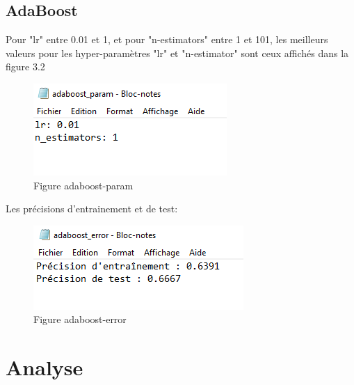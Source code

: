 \subsection{AdaBoost} 
\par Pour "lr" entre 0.01 et 1, et pour "n-estimators" entre 1 et 101, les meilleurs valeurs pour les hyper-paramètres "lr" et "n-estimator" sont ceux affichés dans la figure 3.2
\begin{figure}[H]
    \centering
    \includegraphics{adaboost_param.PNG}
    \caption{Figure adaboost-param }
    \label{Figure fichier adaboost-param }
\end{figure}
\par Les précisions d'entrainement et de test:
\begin{figure}[H]
    \centering
    \includegraphics{adaboost.PNG}
    \caption{Figure adaboost-error }
    \label{Figure fichier adaboost-error }
\end{figure}
\section{Analyse}
